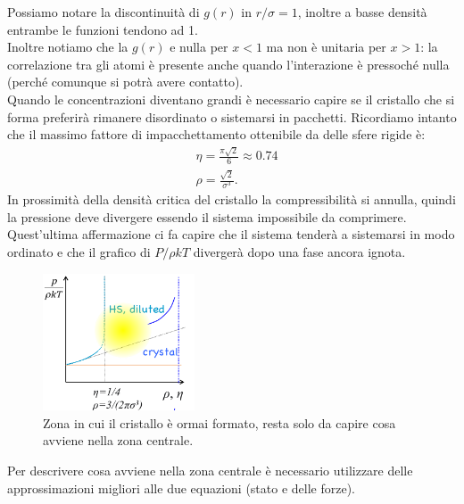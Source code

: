 \noindent
Possiamo notare la discontinuità di $g(r)$ in $r/\sigma=1$, inoltre a basse densità entrambe le funzioni tendono ad 1. \\
Inoltre notiamo che la $g(r)$ e nulla per $x<1$ ma non è unitaria per $x>1$: la correlazione tra gli atomi è presente anche quando l'interazione è pressoché nulla (perché comunque si potrà avere contatto).\\
Quando le concentrazioni diventano grandi è necessario capire se il cristallo che si forma preferirà rimanere disordinato o sistemarsi in pacchetti. Ricordiamo intanto che il massimo fattore di impacchettamento ottenibile da delle sfere rigide è:
\[\begin{aligned}
	&\eta = \frac{\pi\sqrt{2} }{6} \approx 0.74\\
	&\rho = \frac{\sqrt{2}}{\sigma^3}
.\end{aligned}\]
In prossimità della densità critica del cristallo la compressibilità si annulla, quindi la pressione deve divergere essendo il sistema impossibile da comprimere. Quest'ultima affermazione ci fa capire che il sistema tenderà a sistemarsi in modo ordinato e che il grafico di $P/\rho kT$ divergerà dopo una fase ancora ignota.
\begin{figure}[H]
	\centering
	\includegraphics[width=0.4\textwidth]{figures/formato-cristallo-sfere-rigide.png}
	\caption{\scriptsize Zona in cui il cristallo è ormai formato, resta solo da capire cosa avviene nella zona centrale.}
	\label{fig:figures-formato-cristallo-sfere-rigide-png}
\end{figure}
\noindent
Per descrivere cosa avviene nella zona centrale è necessario utilizzare delle approssimazioni migliori alle due equazioni (stato e delle forze).
